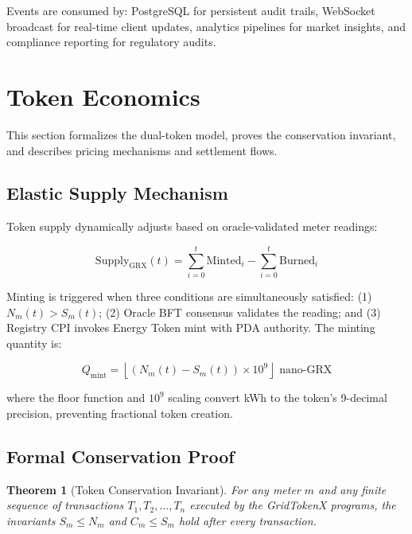 \documentclass[conference]{IEEEtran}
\newtheorem{theorem}{Theorem}
\begin{document}
Events are consumed by: PostgreSQL for persistent audit trails, WebSocket broadcast for real-time client updates, analytics pipelines for market insights, and compliance reporting for regulatory audits.

\section{Token Economics}
\label{sec:tokens}

This section formalizes the dual-token model, proves the conservation invariant, and describes pricing mechanisms and settlement flows.

\subsection{Elastic Supply Mechanism}

Token supply dynamically adjusts based on oracle-validated meter readings:

\begin{equation}
\text{Supply}_{\text{GRX}}(t) = \sum_{i=0}^{t} \text{Minted}_i - \sum_{i=0}^{t} \text{Burned}_i
\label{eq:supply}
\end{equation}

Minting is triggered when three conditions are simultaneously satisfied: (1) $N_m(t) > S_m(t)$; (2) Oracle BFT consensus validates the reading; and (3) Registry CPI invokes Energy Token mint with PDA authority. The minting quantity is:

\begin{equation}
Q_{\text{mint}} = \left\lfloor \left(N_m(t) - S_m(t)\right) \times 10^9 \right\rfloor \text{ nano-GRX}
\label{eq:minting}
\end{equation}

where the floor function and $10^9$ scaling convert kWh to the token's 9-decimal precision, preventing fractional token creation.

\subsection{Formal Conservation Proof}

\begin{theorem}[Token Conservation Invariant]
\label{thm:conservation}
For any meter $m$ and any finite sequence of transactions $T_1, T_2, \ldots, T_n$ executed by the GridTokenX programs, the invariants $S_m \leq N_m$ and $C_m \leq S_m$ hold after every transaction.
\end{theorem}
\end{document}
